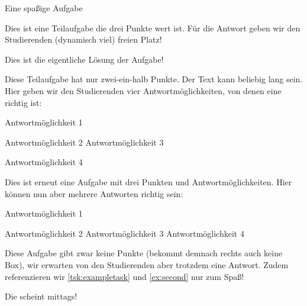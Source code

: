 \begin{Exercise}{Eine spaßige Aufgabe}
\begin{tasks}
    Dies ist eine Teilaufgabe die drei Punkte wert ist. Für die Antwort geben wir den Studierenden (dynamisch viel) freien Platz!
   \VerticalSpace
   \begin{solution}
      Dies ist die eigentliche Lösung der Aufgabe!
   \end{solution}
    \label{tsk:exampletask}Diese Teilaufgabe hat nur zwei-ein-halb Punkte. Der Text kann beliebig lang sein. Hier geben wir den Studierenden vier Antwortmöglichkeiten, von denen eine richtig ist:
   \begin{radioboxes}
      \item    Antwortmöglichkeit 1
      \item    Antwortmöglichkeit 2
      \correct Antwortmöglichkeit 3
      \item    Antwortmöglichkeit 4
   \end{radioboxes}
    Dies ist erneut eine Aufgabe mit drei Punkten und Antwortmöglichkeiten. Hier können nun aber mehrere Antworten richtig sein:
   \begin{checkboxes}
      \correct Antwortmöglichkeit 1
      \item    Antwortmöglichkeit 2
      \correct Antwortmöglichkeit 3
      \correct Antwortmöglichkeit 4
   \end{checkboxes}
    Diese Aufgabe gibt zwar keine Punkte (bekommt demnach rechts auch keine Box), wir erwarten von den Studierenden aber trotzdem eine Antwort. Zudem referenzieren wir \autoref{tsk:exampletask} und \autoref{ex:second} nur zum Spaß!

   Die  scheint mittags!
   \qquad\strut
\end{tasks}
\end{Exercise}
